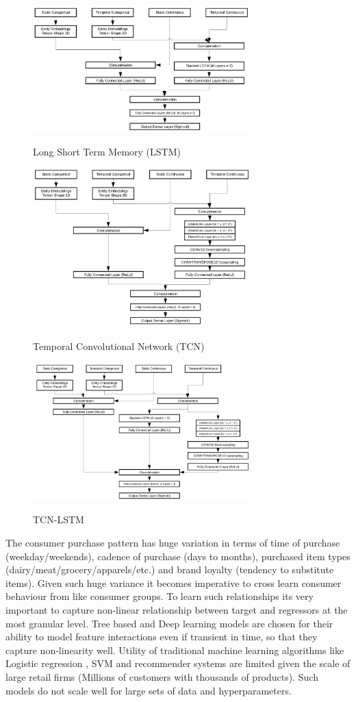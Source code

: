   \begin{figure}[t]
    \centering 
    \caption{Long Short Term Memory (LSTM)} 
    \includegraphics[width=3.3in]{img/LSTM.png} 
    \label{fig:LSTM} 
  \end{figure}
  \begin{figure}[t]
    \centering 
    \caption{Temporal Convolutional Network (TCN)} 
    \includegraphics[width=3.3in]{img/TCN.png} 
    \label{fig:TCN} 
  \end{figure}
  \begin{figure}[t]
    \centering 
    \caption{TCN-LSTM} 
    \includegraphics[width=3.3in]{img/TCNLSTM.png} 
    \label{fig:TCN-LSTM} 
  \end{figure}

The consumer purchase pattern has huge variation in terms of time of purchase (weekday/weekends), 
cadence of purchase (days to months), purchased item types (dairy/meat/grocery/apparels/etc.)
and brand loyalty (tendency to substitute items). Given such huge variance it becomes imperative 
to cross learn consumer behaviour from like consumer groups. To learn such relationships its very 
important to capture non-linear relationship between target and regressors at the most granular level.
Tree based and Deep learning models are chosen for their ability to model feature interactions even if transient in time, 
so that they capture non-linearity well. Utility of traditional machine learning algorithms like Logistic regression
, SVM and recommender systems are limited given the scale of large retail firms 
(Millions of customers with thousands of products). Such models do not scale well for large sets of data and hyperparameters.

